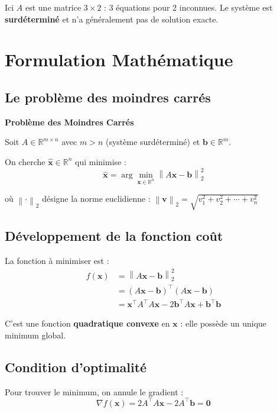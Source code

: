 \documentclass[12pt,a4paper]{article}
\newcommand{\R}{\mathbb{R}}
\newcommand{\norm}[1]{\left\| #1 \right\|}
\newcommand{\T}{^\top}
\begin{document}
Ici $A$ est une matrice $3 \times 2$ : 3 équations pour 2 inconnues. Le système est \textbf{surdéterminé} et n'a généralement pas de solution exacte.

\newpage
\section{Formulation Mathématique}

\subsection{Le problème des moindres carrés}

\begin{theorembox}
\textbf{Problème des Moindres Carrés}

Soit $A \in \R^{m \times n}$ avec $m > n$ (système surdéterminé) et $\mathbf{b} \in \R^m$.

On cherche $\hat{\mathbf{x}} \in \R^n$ qui minimise :
\begin{equation}
\hat{\mathbf{x}} = \arg\min_{\mathbf{x} \in \R^n} \norm{A\mathbf{x} - \mathbf{b}}_2^2
\end{equation}

où $\norm{\cdot}_2$ désigne la norme euclidienne : $\norm{\mathbf{v}}_2 = \sqrt{v_1^2 + v_2^2 + \cdots + v_n^2}$
\end{theorembox}

\subsection{Développement de la fonction coût}

La fonction à minimiser est :
\begin{align}
f(\mathbf{x}) &= \norm{A\mathbf{x} - \mathbf{b}}_2^2 \\[0.3cm]
&= (A\mathbf{x} - \mathbf{b})\T (A\mathbf{x} - \mathbf{b}) \\[0.3cm]
&= \mathbf{x}\T A\T A \mathbf{x} - 2\mathbf{b}\T A \mathbf{x} + \mathbf{b}\T \mathbf{b}
\end{align}

C'est une fonction \textbf{quadratique convexe} en $\mathbf{x}$ : elle possède un unique minimum global.

\subsection{Condition d'optimalité}

Pour trouver le minimum, on annule le gradient :
\begin{equation}
\nabla f(\mathbf{x}) = 2A\T A \mathbf{x} - 2A\T \mathbf{b} = \mathbf{0}
\end{equation}
\end{document}
